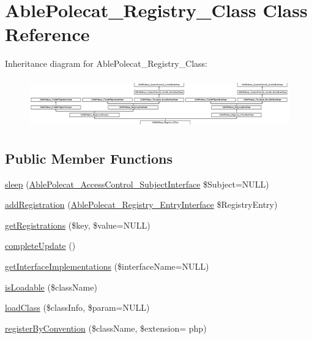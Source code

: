 \hypertarget{class_able_polecat___registry___class}{}\section{Able\+Polecat\+\_\+\+Registry\+\_\+\+Class Class Reference}
\label{class_able_polecat___registry___class}
Inheritance diagram for Able\+Polecat\+\_\+\+Registry\+\_\+\+Class\+:\begin{figure}[H]
\begin{center}
\leavevmode
\includegraphics[height=2.167742cm]{class_able_polecat___registry___class}
\end{center}
\end{figure}
\subsection*{Public Member Functions}
\begin{DoxyCompactItemize}
\item 
\hyperlink{class_able_polecat___registry___class_a365e24d7b066205cafa2a5cce3a4f224}{sleep} (\hyperlink{interface_able_polecat___access_control___subject_interface}{Able\+Polecat\+\_\+\+Access\+Control\+\_\+\+Subject\+Interface} \$Subject=N\+U\+L\+L)
\item 
\hyperlink{class_able_polecat___registry___class_a22d8ddb551ccf544f1d2615db68ca9b1}{add\+Registration} (\hyperlink{interface_able_polecat___registry___entry_interface}{Able\+Polecat\+\_\+\+Registry\+\_\+\+Entry\+Interface} \$Registry\+Entry)
\item 
\hyperlink{class_able_polecat___registry___class_a6f24c4ddef3e1c5dde4933e817fc5b4b}{get\+Registrations} (\$key, \$value=N\+U\+L\+L)
\item 
\hyperlink{class_able_polecat___registry___class_a363ee22699ad46520333ef24f64798bb}{complete\+Update} ()
\item 
\hyperlink{class_able_polecat___registry___class_a2cbf8a40e004bf662f17eaac0747831e}{get\+Interface\+Implementations} (\$interface\+Name=N\+U\+L\+L)
\item 
\hyperlink{class_able_polecat___registry___class_a65a6dfafeb7666e8b6b54209b958f7b0}{is\+Loadable} (\$class\+Name)
\item 
\hyperlink{class_able_polecat___registry___class_af58c5b3a44f9688f9e90dd35abbdefa2}{load\+Class} (\$class\+Info, \$param=N\+U\+L\+L)
\item 
\hyperlink{class_able_polecat___registry___class_a57948ec84115148de6cb2f516185ead7}{register\+By\+Convention} (\$class\+Name, \$extension= \textquotesingle{}php\textquotesingle{})
\end{DoxyCompactItemize}
